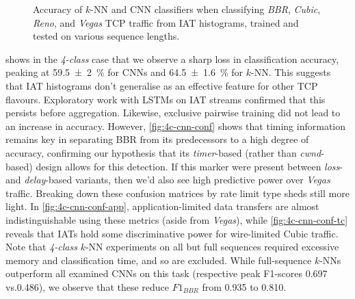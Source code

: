 \begin{figure}
    \centering
    \caption{Accuracy of $k$-NN and CNN classifiers when classifying \emph{BBR}, \emph{Cubic}, \emph{Reno}, and \emph{Vegas} TCP traffic from IAT histograms, trained and tested on various sequence lengths.}
    \label{fig:4c-results}
\end{figure}

 shows in the \emph{4-class} case that we observe a sharp loss in classification accuracy, peaking at \SI{59.5 +- 2}{\percent} for CNNs and \SI{64.5 +- 1.6}{\percent} for $k$-NN.
This suggests that IAT histograms don't generalise as an effective feature for other TCP flavours.
Exploratory work with LSTMs on IAT streams confirmed that this persists before aggregation.
Likewise, exclusive pairwise training did not lead to an increase in accuracy.
However, \cref{fig:4c-cnn-conf} shows that timing information remains key in separating BBR from its predecessors to a high degree of accuracy, confirming our hypothesis that its \emph{timer}-based (rather than \emph{cwnd}-based) design allows for this detection.
If this marker were present between \emph{loss}- and \emph{delay}-based variants, then we'd also see high predictive power over \emph{Vegas} traffic.
Breaking down these confusion matrices by rate limit type sheds still more light.
In \cref{fig:4c-cnn-conf-app}, application-limited data transfers are almost indistinguishable using these metrics (aside from \emph{Vegas}), while \cref{fig:4c-cnn-conf-tc} reveals that IATs hold some discriminative power for wire-limited Cubic traffic.
Note that \emph{4-class} $k$-NN experiments on all but full sequences required excessive memory and classification time, and so are excluded.
While full-sequence $k$-NNs outperform all examined CNNs on this task (respective peak F1-scores \num{0.697} vs.\@ \num{0.486}), we observe that these reduce $\mathit{F1}_\mathit{BBR}$ from \num{0.935} to \num{0.810}.

